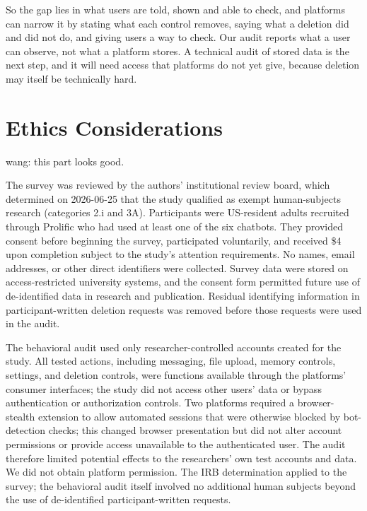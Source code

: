 \documentclass[conference,compsoc]{IEEEtran}
\newcommand{\xw}[1] {{\color{red}wang: #1}}
\begin{document}
So the gap lies in what users are told, shown and able to check, and platforms can narrow it by stating what each control removes, saying what a deletion did and did not do, and giving users a way to check. Our audit reports what a user can observe, not what a platform stores. A technical audit of stored data is the next step, and it will need access that platforms do not yet give, because deletion may itself be technically hard.

\section*{Ethics Considerations}

\xw{this part looks good.}

The survey was reviewed by the authors' institutional review board, which determined on 2026-06-25 that the study qualified as exempt human-subjects research (categories 2.i and 3A). Participants were US-resident adults recruited through Prolific who had used at least one of the six chatbots. They provided consent before beginning the survey, participated voluntarily, and received \$4 upon completion subject to the study's attention requirements. No names, email addresses, or other direct identifiers were collected. Survey data were stored on access-restricted university systems, and the consent form permitted future use of de-identified data in research and publication. Residual identifying information in participant-written deletion requests was removed before those requests were used in the audit.

The behavioral audit used only researcher-controlled accounts created for the study. All tested actions, including messaging, file upload, memory controls, settings, and deletion controls, were functions available through the platforms' consumer interfaces; the study did not access other users' data or bypass authentication or authorization controls. Two platforms required a browser-stealth extension to allow automated sessions that were otherwise blocked by bot-detection checks; this changed browser presentation but did not alter account permissions or provide access unavailable to the authenticated user. The audit therefore limited potential effects to the researchers' own test accounts and data. We did not obtain platform permission. The IRB determination applied to the survey; the behavioral audit itself involved no additional human subjects beyond the use of de-identified participant-written requests.



\end{document}
